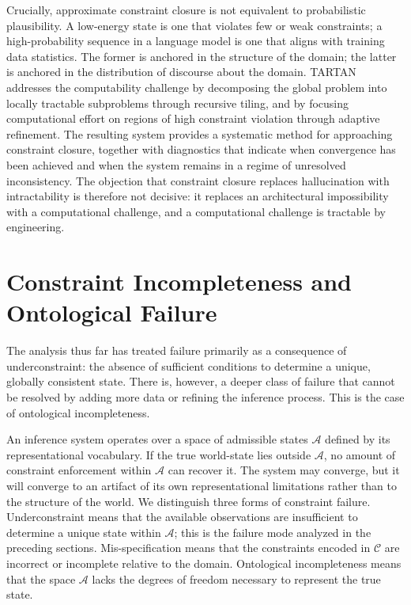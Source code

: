 \documentclass[11pt, oneside]{article}
\begin{document}
Crucially, approximate constraint closure is not equivalent to probabilistic plausibility. A low-energy state is one that violates few or weak constraints; a high-probability sequence in a language model is one that aligns with training data statistics. The former is anchored in the structure of the domain; the latter is anchored in the distribution of discourse about the domain. TARTAN addresses the computability challenge by decomposing the global problem into locally tractable subproblems through recursive tiling, and by focusing computational effort on regions of high constraint violation through adaptive refinement. The resulting system provides a systematic method for approaching constraint closure, together with diagnostics that indicate when convergence has been achieved and when the system remains in a regime of unresolved inconsistency. The objection that constraint closure replaces hallucination with intractability is therefore not decisive: it replaces an architectural impossibility with a computational challenge, and a computational challenge is tractable by engineering.

\section{Constraint Incompleteness and Ontological Failure}

The analysis thus far has treated failure primarily as a consequence of underconstraint: the absence of sufficient conditions to determine a unique, globally consistent state. There is, however, a deeper class of failure that cannot be resolved by adding more data or refining the inference process. This is the case of ontological incompleteness.

An inference system operates over a space of admissible states $\mathcal{A}$ defined by its representational vocabulary. If the true world-state lies outside $\mathcal{A}$, no amount of constraint enforcement within $\mathcal{A}$ can recover it. The system may converge, but it will converge to an artifact of its own representational limitations rather than to the structure of the world. We distinguish three forms of constraint failure. Underconstraint means that the available observations are insufficient to determine a unique state within $\mathcal{A}$; this is the failure mode analyzed in the preceding sections. Mis-specification means that the constraints encoded in $\mathcal{C}$ are incorrect or incomplete relative to the domain. Ontological incompleteness means that the space $\mathcal{A}$ lacks the degrees of freedom necessary to represent the true state.
\end{document}
